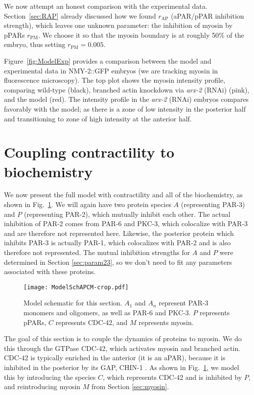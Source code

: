 \documentclass[11pt]{article}
\newcommand{\6}[1]{#1_{\text{6}}}
\newcommand{\3}[1]{#1_{\text{3}}}
\begin{document}
We now attempt an honest comparison with the experimental data. Section\ \ref{sec:RAP} already discussed how we found $r_\text{AP}$ (aPAR/pPAR inhibition strength), which leaves one unknown parameter: the inhibition of myosin by pPARs $r_\text{PM}$. We choose it so that the myosin boundary is at roughly 50\% of the embryo, thus setting $r_\text{PM}=0.005$. 

Figure\ \ref{fig:ModelExp} provides a comparison between the model and experimental data in NMY-2::GFP embryos (we are tracking myosin in fluorescence microscopy). The top plot shows the myosin intensity profile, comparing wild-type (black), branched actin knockdown via \emph{arx-2} (RNAi) (pink), and the model (red). The intensity profile in the \emph{arx-2} (RNAi) embryos compares favorably with the model; as there is a zone of low intensity in the posterior half and transitioning to zone of high intensity at the anterior half.

\fi 

\section{Coupling contractility to biochemistry }
We now present the full model with contractility and all of the biochemistry, as shown in Fig.\ \ref{fig:SchAPCM}. We will again have two protein species $A$ (representing PAR-3) and $P$ (representing PAR-2), which mutually inhibit each other. The actual inhibition of PAR-2 comes from PAR-6 and PKC-3, which colocalize with PAR-3 and are therefore not represented here. Likewise, the posterior protein which inhibits PAR-3 is actually PAR-1, which colocalizes with PAR-2 and is also therefore not represented. The mutual inhibition strengths for $A$ and $P$ were determined in Section \ref{sec:param23}, so we don't need to fit any parameters associated with these proteins.


\begin{figure}
\centering
\texttt{[image: ModelSchAPCM-crop.pdf]}
\caption{\label{fig:SchAPCM}Model schematic for this section. $A_1$ and $A_n$ represent PAR-3 monomers and oligomers, as well as PAR-6 and PKC-3. $P$ represents pPARs, $C$ represents CDC-42, and $M$ represents myosin.}
\end{figure}

The goal of this section is to couple the dynamics of proteins to myosin. We do this through the GTPase CDC-42, which activates myosin and branched actin. CDC-42 is typically enriched in the anterior (it is an aPAR), because it is inhibited in the posterior by its GAP, CHIN-1 \cite{sailer2015dynamic}. As shown in Fig.\ \ref{fig:SchAPCM}, we model this by introducing the species $C$, which represents CDC-42 and is inhibited by $P$, and reintroducing myosin $M$ from Section \ref{sec:myosin}. 
\end{document}

